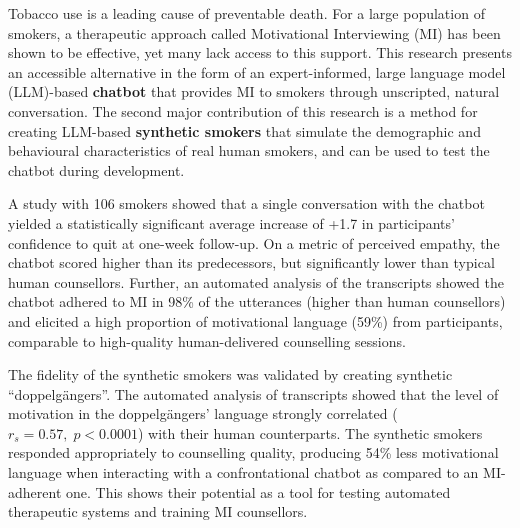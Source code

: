 Tobacco use is a leading cause of preventable death. For a large population of smokers, a therapeutic approach called Motivational Interviewing (MI) has been shown to be effective, yet many lack access to this support. This research presents an accessible alternative in the form of an expert-informed, large language model (LLM)-based \textbf{chatbot} that provides MI to smokers through unscripted, natural conversation. The second major contribution of this research is a method for creating LLM-based \textbf{synthetic smokers} that simulate the demographic and behavioural characteristics of real human smokers, and can be used to test the chatbot during development.

A study with 106 smokers showed that a single conversation with the chatbot yielded a statistically significant average increase of +1.7 in participants' confidence to quit at one-week follow-up. On a metric of perceived empathy, the chatbot scored higher than its predecessors, but significantly lower than typical human counsellors. Further, an automated analysis of the transcripts showed the chatbot adhered to MI in 98\% of the utterances (higher than human counsellors) and elicited a high proportion of motivational language (59\%) from participants, comparable to high-quality human-delivered counselling sessions.

The fidelity of the synthetic smokers was validated by creating synthetic ``doppelgängers''. The automated analysis of transcripts showed that the level of motivation in the doppelgängers' language strongly correlated ($r_s=0.57,
\; p < 0.0001$) with their human counterparts. The synthetic smokers responded appropriately to counselling quality, producing 54\% less motivational language when interacting with a confrontational chatbot as compared to an MI-adherent one. This shows their potential as a tool for testing automated therapeutic systems and training MI counsellors.